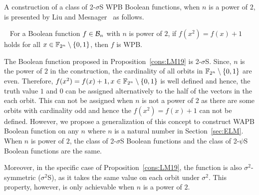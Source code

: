 \documentclass{llncs}
\begin{document}
A construction of a class of 2-$\sigma$S WPB Boolean functions, when $n$ is a power of $2$, is presented by Liu and Mesnager~\cite{DCC:LiuMes19} as follows.
\begin{proposition}~\cite{DCC:LiuMes19}\label{cons:LM19} For a Boolean function $f \in \mathcal{B}_n$ with $n$ is power of $2$, if $f(x^2)=f(x)+1$ holds for all $x \in \mathbb{F}_{2^n} \setminus \{0,1\}$, then $f$ is WPB.  
\end{proposition}
The Boolean function proposed in Proposition~\ref{cons:LM19} is 2-$\sigma$S.
Since, $n$ is the power of $2$ in the construction, the cardinality of all orbits in $\mathbb{F}_{2^n} \setminus \{0,1\}$ are even. Therefore, $f(x^2)=f(x)+1, x \in \mathbb{F}_{2^n} \setminus \{0,1\}$ is well defined and hence, the truth value $1$ and $0$ can be assigned alternatively to the half of the vectors in the each orbit. This can not be assigned when $n$ is not a power of $2$ as there are some orbits with cardinality odd and hence the $f(x^2) = f(x)+1$ can not be defined. 
However, we propose a generalization of this concept to construct WAPB Boolean function on any $n$ where $n$ is a natural number in Section~\ref{sec:ELM}. 
When $n$ is power of $2$, the class of 2-$\sigma$S Boolean functions and the class of 2-$\psi$S Boolean functions are the same. 

Moreover, in the specific case of Proposition~\ref{cons:LM19}, the function is also $\sigma^2$-symmetric ($\sigma^2$S), as it takes the same value on each orbit under $\sigma^2$. This property, however, is only achievable when $n$ is a power of $2$.
\end{document}
